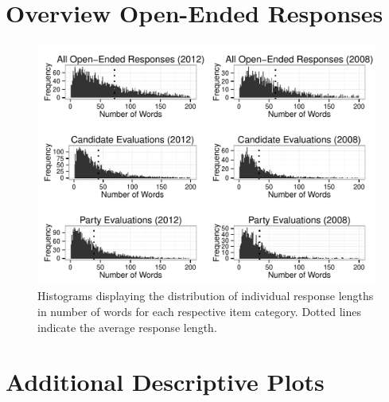 \documentclass[12pt]{article}
\begin{document}


\clearpage
\section{Overview Open-Ended Responses}\label{app:oview}
\renewcommand\thefigure{\thesection.\arabic{figure}}
\renewcommand\thetable{\thesection.\arabic{table}}
\setcounter{figure}{0}
\setcounter{table}{0}



\begin{figure}[h]\centering
\includegraphics[scale=.7]{../calc/fig/appB2num.pdf}
\caption{Histograms displaying the distribution of individual response lengths in number of words for each respective item category. Dotted lines indicate the average response length.}\label{fig:appB2num}
\end{figure}

\clearpage
\section{Additional Descriptive Plots}\label{app:desc}
\renewcommand\thefigure{\thesection.\arabic{figure}}
\renewcommand\thetable{\thesection.\arabic{table}}
\setcounter{figure}{0}
\setcounter{table}{0}
\end{document}
